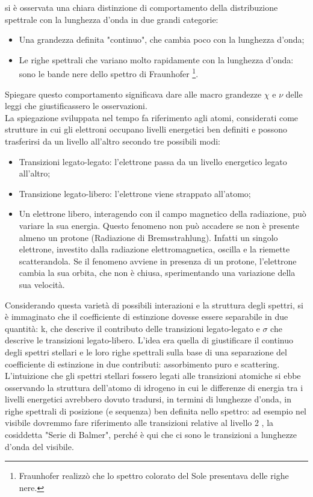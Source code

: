 \documentclass[a4paper,11pt]{article}
\begin{document}
    si è osservata una chiara distinzione di comportamento della distribuzione spettrale con la lunghezza d'onda in due grandi categorie:
     \begin{itemize}
        \item Una grandezza definita "continuo", che cambia poco con la lunghezza d'onda;
        \item Le righe spettrali che variano molto rapidamente con la lunghezza d'onda: sono le bande nere dello spettro di Fraunhofer \footnote{Fraunhofer  realizzò che lo spettro colorato del Sole presentava delle righe nere.}.
    \end{itemize}
        Spiegare questo comportamento significava dare alle macro grandezze ${\chi}$ e ${\nu}$ delle leggi che giustificassero le osservazioni.\\ La spiegazione sviluppata nel tempo fa riferimento agli atomi, considerati come strutture in cui gli elettroni occupano livelli energetici ben definiti e possono trasferirsi da un livello all'altro secondo tre possibili modi:
        \begin {itemize}
            \item Transizioni legato-legato: l'elettrone passa da un livello energetico legato all'altro;
            \item Transizione legato-libero: l'elettrone viene strappato all'atomo;
            \item Un elettrone libero, interagendo con il campo magnetico della radiazione, può variare la sua energia. Questo fenomeno non può accadere se non è presente almeno un protone (Radiazione di Bremsstrahlung). Infatti un singolo elettrone, investito dalla radiazione elettromagnetica, oscilla e la riemette scatterandola. Se il fenomeno avviene in presenza di un protone, l'elettrone cambia la sua orbita, che non è chiusa, sperimentando una variazione della sua velocità.
    \end{itemize}
    Considerando questa varietà di possibili interazioni e la struttura  degli spettri, si è immaginato che il coefficiente di estinzione dovesse essere separabile in due quantità: k, che descrive il contributo delle transizioni legato-legato e ${\sigma}$ che descrive le transizioni legato-libero. L'idea era quella di giustificare il continuo degli spettri stellari e le loro righe spettrali sulla base di una separazione del coefficiente di estinzione in due contributi: assorbimento puro e scattering.\\
    L'intuizione che gli spettri stellari fossero legati alle transizioni atomiche si ebbe osservando la struttura dell'atomo di idrogeno in cui le differenze di energia tra i livelli energetici avrebbero dovuto tradursi, in termini di lunghezze d'onda, in righe spettrali di posizione (e sequenza) ben definita nello spettro: ad esempio nel visibile dovremmo fare riferimento alle transizioni relative al livello 2 , la cosiddetta "Serie di Balmer", perché è qui che ci sono le transizioni a lunghezze d'onda del visibile.
    
\end{document}
